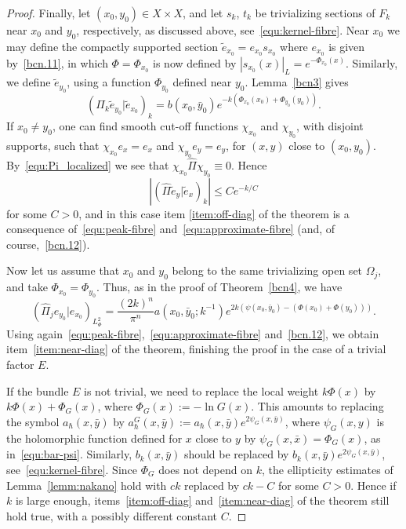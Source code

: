 \documentclass{article}
\newcommand{\abs}[1]{\left|#1\right|}
\newcommand{\h}{\hbar}
\newcommand{\pscal}[2]{\left(#1 | #2\right)}
\begin{document}
\begin{proof}
  Finally, let $(x_0,y_0)\in X\times X$, and let $s_k$, $t_k$ be
  trivializing sections of $F_k$ near $x_0$ and $y_0$, respectively,
  as discussed above, see~\eqref{equ:kernel-fibre}.  Near $x_0$ we may
  define the compactly supported section
  $\tilde e_{x_0} = e_{x_0} s_{x_0}$ where $e_{x_0}$ is given
  by~\eqref{bcn.11}, in which $\Phi=\Phi_{x_0}$ is now defined by
  $\abs{s_{x_0}(x)}_{L}= e^{-\Phi_{x_0}(x)}$.  Similarly, we define
  $\tilde e_{y_0}$, using a function $\Phi_{y_0}$ defined near $y_0$.
  Lemma~\ref{bcn3} gives
  \begin{equation}
    \label{equ:peak-fibre}
    \pscal{\Pi_k \tilde e_{y_0}}{\tilde e_{x_0}}_k = b(x_0,\bar y_0)
    e^{-k(\Phi_{x_0}(x_0) + \Phi_{y_0}(y_0))}.
  \end{equation}
  If $x_0 \neq y_0$, one can find smooth cut-off functions
  $\chi_{x_0}$ and $\chi_{y_0}$, with disjoint supports, such that
  $\chi_{x_0} e_{x}= e_{x}$ and $\chi_{y_0} e_{y}= e_{y}$, for $(x,y)$
  close to $(x_0,y_0)$.  By~\eqref{equ:Pi_localized} we see that
  $\chi_{x_0}\hat\Pi \chi_{y_0} \equiv 0$. Hence
  \[
  \abs{\pscal{\hat \Pi \tilde e_{y}}{\tilde e_{x}}_k} \leq C e^{-k/C}
  \]
  for some $C>0$, and in this case item \ref{item:off-diag} of the
  theorem is a consequence of~\eqref{equ:peak-fibre}
  and~\eqref{equ:approximate-fibre} (and, of course,~\eqref{bcn.12}).

  Now let us assume that $x_0$ and $y_0$ belong to the same
  trivializing open set $\Omega_j$, and take
  $\Phi_{x_0} = \Phi_{y_0}$.  Thus, as in the proof of
  Theorem~\ref{bcn4}, we have
  \[
  \pscal{\hat\Pi_j e_{y_0}}{e_{x_0}}_{L^2_{\Phi}} =
  \frac{(2k)^n}{\pi^n} a(x_0,\bar{y}_0;k^{-1})e^{2k(\psi
    (x_0,\bar{y}_0) - (\Phi(x_0)+\Phi (y_0)))}.
  \]
  Using again~\eqref{equ:peak-fibre},~\eqref{equ:approximate-fibre}
  and~\eqref{bcn.12}, we obtain item~\ref{item:near-diag} of the
  theorem, finishing the proof in the case of a trivial factor $E$.

  If the bundle $E$ is not trivial, we need to replace the local
  weight $k\Phi(x)$ by $k\Phi(x) + \Phi_G(x)$, where
  $\Phi_G(x) := - \ln G(x)$.  This amounts to replacing the symbol
  $a_\h(x,\bar y)$ by
  $a_\h^G(x,\bar y) := a_\h(x,\bar y) e^{2\psi_G(x,\bar y)}$, where
  $\psi_G(x, y)$ is the holomorphic function defined for $x$ close to
  $y$ by $\psi_G(x, \bar x) = \Phi_G(x)$, as in~\eqref{equ:bar-psi}.
  Similarly, $b_k(x,\bar y)$ should be replaced by
  $b_k(x,\bar y)e^{2\psi_G(x,\bar y)}$, see~\eqref{equ:kernel-fibre}.
  Since $\Phi_G$ does not depend on $k$, the ellipticity estimates of
  Lemma~\ref{lemm:nakano} hold with $ck$ replaced by $ck-C$ for some
  $C>0$. Hence if $k$ is large enough, items~\ref{item:off-diag}
  and~\ref{item:near-diag} of the theorem still hold true, with a
  possibly different constant $C$.
\end{proof}
\end{document}
